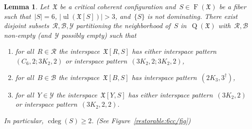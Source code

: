 \documentclass[english,a4paper]{article}
\theoremstyle{plain}
\newtheorem{lemma}      [theorem]{Lemma}
\theoremstyle{definition}
\newcommand{\abs}[1]{| #1 |}
\DeclareMathOperator{\Fibers}{F}
\newcommand{\coherentConfig}{\ensuremath{\mathfrak{X}}}
\newcommand{\fibers}[1]{\ensuremath{\Fibers \left( #1 \right)}}
\newcommand{\interspace}[2]{\ensuremath{\coherentConfig[#1,#2]}}
\newcommand{\inducedCC}[1]{\ensuremath{\coherentConfig[#1]}}
\DeclareMathOperator*{\ul}{ul}
\DeclareMathOperator*{\Quotient}{Q}
\newcommand{\quotientGraph}[1]{\ensuremath{\Quotient(#1)}}
\DeclareMathOperator{\ColorDeg}{cdeg}
\newcommand{\colorDeg}[1]{\ensuremath{\ColorDeg\left(#1\right)}}
\newcommand{\ipsixMatching}             {\ensuremath{(\disjointCliques{3}{2},2)}}
\newcommand{\ipsixMatchingTwice}        {\ensuremath{(\disjointCliques{3}{2},2,2)}}
\newcommand{\ipsixMatchingMatching}     {\ensuremath{(\disjointCliques{3}{2},2;\disjointCliques{3}{2},2)}}
\newcommand{\ipsixMatchingAndCycle}     {\ensuremath{(\cycle{6},2;\disjointCliques{3}{2},2)}}
\newcommand{\ipsixTriangle}               {\ensuremath{(\disjointCliques{2}{3},3^\dag)}}
\newcommand{\clique}[1]{\ensuremath{K_{#1}}}
\newcommand{\cycle}[1]{\ensuremath{C_{#1}}}
\newcommand{\disjointCliques}[2]{\ensuremath{#1 \clique{#2}}}
\begin{document}
\begin{lemma}
\label{critical:6-cc:restorable:large-neighborhood/lem}
    Let~$\coherentConfig$ be a critical coherent configuration and~$S \in \fibers{\coherentConfig}$ be a fiber such that~$\abs{S} = 6$, $\abs{\ul(\inducedCC{S})} > 3$, and~$\{S\}$ is not dominating.
    There exist disjoint subsets~$\mathcal{R},\mathcal{B}, \mathcal{Y}$ partitioning the neighborhood of~$S$ in~$\quotientGraph{\coherentConfig}$ with~$\mathcal{R},\mathcal{B}$ non-empty (and~$\mathcal{Y}$ possibly empty) such that
    \begin{enumerate}
        \item for all~$R \in \mathcal{R}$ the interspace~$\interspace{R}{S}$ has either interspace pattern~$\ipsixMatchingAndCycle$ or interspace pattern~$\ipsixMatchingMatching$,
        \item for all~$B \in \mathcal{B}$ the interspace~$\interspace{B}{S}$ has interspace pattern~$\ipsixTriangle$,
        \item for all~$Y \in \mathcal{Y}$ the interspace~$\interspace{Y}{S}$ has either interspace pattern~$\ipsixMatching$ or interspace pattern~$\ipsixMatchingTwice$.
    \end{enumerate}
    In particular, $\colorDeg{S} \geq 2$. (See Figure~\ref{restorable:6cc/fig})
\end{lemma}
\end{document}
